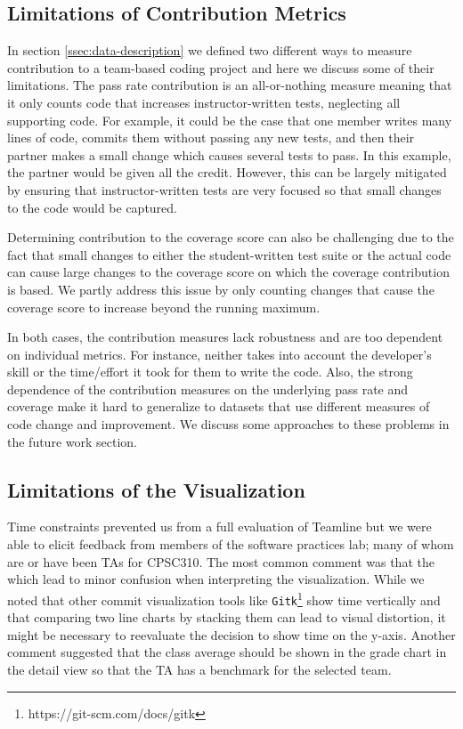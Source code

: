 \documentclass[../manifest.tex]{subfiles}
\begin{document}
\subsection{Limitations of Contribution Metrics}
In section \ref{ssec:data-description} we defined two different ways to measure contribution to a team-based coding project and here we discuss some of their limitations.
The pass rate contribution is an all-or-nothing measure meaning that it only counts code that increases instructor-written tests, neglecting all supporting code. For example, it could be the case that one member writes many lines of code, commits them without passing any new tests, and then their partner makes a small change which causes several tests to pass. In this example, the partner would be given all the credit. However, this can be largely mitigated by ensuring that instructor-written tests are very focused so that small changes to the code would be captured.

Determining contribution to the coverage score can also be challenging due to the fact that small changes to either the student-written test suite or the actual code can cause large changes to the coverage score on which the coverage contribution is based. We partly address this issue by only counting changes that cause the coverage score to increase beyond the running maximum.

In both cases, the contribution measures lack robustness and are too dependent on individual metrics. For instance, neither takes into account the developer's skill or the time/effort it took for them to write the code. Also, the strong dependence of the contribution measures on the underlying pass rate and coverage make it hard to generalize to datasets that use different measures of code change and improvement. We discuss some approaches to these problems in the future work section.



\subsection{Limitations of the Visualization}
Time constraints prevented us from a full evaluation of Teamline but we were able to elicit feedback from members of the software practices lab; many of whom are or have been TAs for CPSC310. The most common comment was that the  which lead to minor confusion when interpreting the visualization. While we noted that other commit visualization tools like \texttt{Gitk}\footnote{https://git-scm.com/docs/gitk} show time vertically and that comparing two line charts by stacking them can lead to visual distortion, it might be necessary to reevaluate the decision to show time on the y-axis. Another comment suggested that the class average should be shown in the grade chart in the detail view so that the TA has a benchmark for the selected team.
\end{document}
